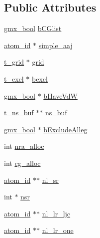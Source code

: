 \subsection*{\-Public \-Attributes}
\begin{DoxyCompactItemize}
\item 
\hyperlink{include_2types_2simple_8h_a8fddad319f226e856400d190198d5151}{gmx\-\_\-bool} \hyperlink{structgmx__ns__t_acfe82ae220e419a621cc7d7029bbe0b4}{b\-C\-Glist}
\item 
\hyperlink{include_2types_2simple_8h_ad3f47cdb48677e516e2049719612c737}{atom\-\_\-id} $\ast$ \hyperlink{structgmx__ns__t_a6e3e9609cef2011914d3ae20c68fe04c}{simple\-\_\-aaj}
\item 
\hyperlink{structt__grid}{t\-\_\-grid} $\ast$ \hyperlink{structgmx__ns__t_ae2c76fae838ad017db32178b381b06ab}{grid}
\item 
\hyperlink{include_2types_2nblist_8h_a5c6c27840e64c247a231b2670f5ba01f}{t\-\_\-excl} $\ast$ \hyperlink{structgmx__ns__t_aba5a498a3c483d8c11b3a74d18825965}{bexcl}
\item 
\hyperlink{include_2types_2simple_8h_a8fddad319f226e856400d190198d5151}{gmx\-\_\-bool} $\ast$ \hyperlink{structgmx__ns__t_a08c86fd736dc6f8e430d5ba962b0b3db}{b\-Have\-Vd\-W}
\item 
\hyperlink{structt__ns__buf}{t\-\_\-ns\-\_\-buf} $\ast$$\ast$ \hyperlink{structgmx__ns__t_ab1d70e301f74eddfcc62bc89fe44bf9f}{ns\-\_\-buf}
\item 
\hyperlink{include_2types_2simple_8h_a8fddad319f226e856400d190198d5151}{gmx\-\_\-bool} $\ast$ \hyperlink{structgmx__ns__t_a13bfade89cde5d9222be7e6250072fd6}{b\-Exclude\-Alleg}
\item 
int \hyperlink{structgmx__ns__t_af1c0ddc157e7da6051ff67bf58fe9bf2}{nra\-\_\-alloc}
\item 
int \hyperlink{structgmx__ns__t_a0c560ea401d6aa466b3139456664edef}{cg\-\_\-alloc}
\item 
\hyperlink{include_2types_2simple_8h_ad3f47cdb48677e516e2049719612c737}{atom\-\_\-id} $\ast$$\ast$ \hyperlink{structgmx__ns__t_ad4e3e2fcc9ec38e6ac756e84e7371314}{nl\-\_\-sr}
\item 
int $\ast$ \hyperlink{structgmx__ns__t_adbc8fc07eb27b31cd7d9846ab9f3403a}{nsr}
\item 
\hyperlink{include_2types_2simple_8h_ad3f47cdb48677e516e2049719612c737}{atom\-\_\-id} $\ast$$\ast$ \hyperlink{structgmx__ns__t_add6897847a7b38cdd5b8d3653a5d3085}{nl\-\_\-lr\-\_\-ljc}
\item 
\hyperlink{include_2types_2simple_8h_ad3f47cdb48677e516e2049719612c737}{atom\-\_\-id} $\ast$$\ast$ \hyperlink{structgmx__ns__t_a678a283ac85d418f1fc9fcdc671f9592}{nl\-\_\-lr\-\_\-one}

\end{DoxyCompactItemize}

